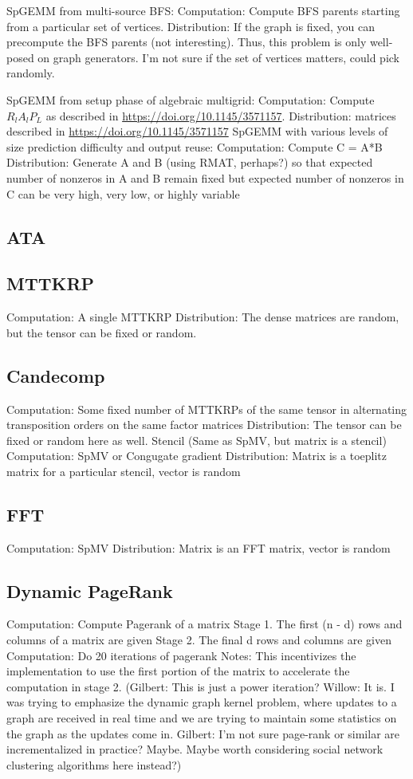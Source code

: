 \documentclass{article}
\begin{document}
SpGEMM from multi-source BFS:
	Computation: Compute BFS parents starting from a particular set of vertices.
	Distribution: If the graph is fixed, you can precompute the BFS parents (not interesting). Thus, this problem is only well-posed on graph generators. I’m not sure if the set of vertices matters, could pick randomly.

SpGEMM from setup phase of algebraic multigrid:
	Computation: Compute $R_lA_lP_L$ as described in \url{https://doi.org/10.1145/3571157}.
	Distribution: matrices described in \url{https://doi.org/10.1145/3571157}
SpGEMM with various levels of size prediction difficulty and output reuse:
	Computation: Compute C = A*B
	Distribution: Generate A and B (using RMAT, perhaps?) so that expected number of nonzeros in A and B remain fixed but expected number of nonzeros in C can be very high, very low, or highly variable

\subsection{ATA}

\subsection{MTTKRP}
	Computation: A single MTTKRP 
	Distribution: The dense matrices are random, but the tensor can be fixed or random.


\subsection{Candecomp}
	Computation: Some fixed number of MTTKRPs of the same tensor in alternating transposition orders on the same factor matrices
	Distribution: The tensor can be fixed or random here as well.
Stencil (Same as SpMV, but matrix is a stencil)
	Computation: SpMV or Congugate gradient
	Distribution: Matrix is a toeplitz matrix for a particular stencil, vector is random

\subsection{FFT}
	Computation: SpMV
	Distribution: Matrix is an FFT matrix, vector is random

\subsection{Dynamic PageRank}
	Computation: Compute Pagerank of a matrix
	Stage 1.
		The first (n - d) rows and columns of a matrix are given
	Stage 2.
		The final d rows and columns are given
	Computation:
		Do 20 iterations of pagerank
	Notes: This incentivizes the implementation to use the first portion of the matrix to accelerate the computation in stage 2.
(Gilbert: This is just a power iteration? Willow: It is. I was trying to emphasize the dynamic graph kernel problem, where updates to a graph are received in real time and we are trying to maintain some statistics on the graph as the updates come in. Gilbert: I'm not sure page-rank or similar are incrementalized in practice?  Maybe.  Maybe worth considering social network clustering algorithms here instead?)
\end{document}

